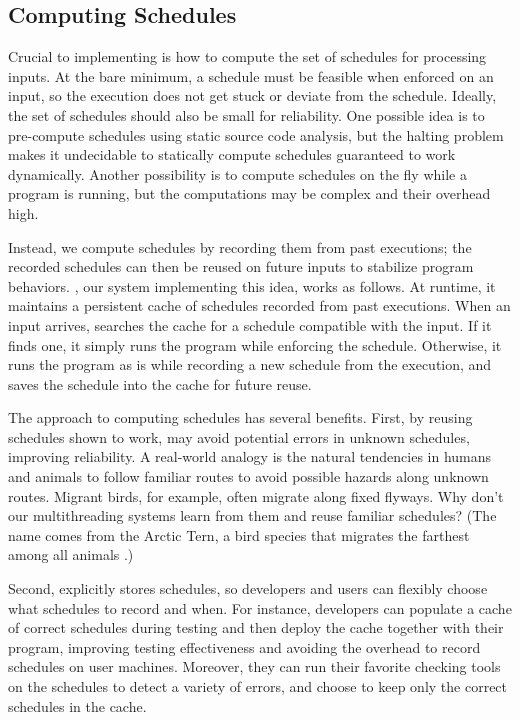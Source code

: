 \subsection{Computing Schedules} \label{sec:memoize}


Crucial to implementing \smt is how to compute the set of schedules for
processing inputs.  At the bare minimum, a schedule must be feasible when
enforced on an input, so the execution does not get stuck or deviate from
the schedule.  Ideally, the set of schedules should also be small for
reliability.  One possible idea is to pre-compute schedules using static
source code analysis, but the halting problem makes it undecidable to
statically compute schedules guaranteed to work dynamically.  Another
possibility is to compute schedules on the fly while a program is running,
but the computations may be complex and their overhead high.

Instead, we compute schedules by recording them from past executions; the
recorded schedules can then be reused on future inputs to stabilize
program behaviors.  \tern, our system implementing this idea, works as
follows.  At runtime, it maintains a persistent cache of schedules
recorded from past executions.  When an input arrives, \tern searches the
cache for a schedule compatible with the input.  If it finds one, it
simply runs the program while enforcing the schedule.  Otherwise, it runs
the program as is while recording a new schedule from the execution, and
saves the schedule into the cache for future reuse.

The \tern approach to computing schedules has several benefits. First, by
reusing schedules shown to work, \tern may avoid potential errors in
unknown schedules, improving reliability.  A real-world analogy is the
natural tendencies in humans and animals to follow familiar routes to
avoid possible hazards along unknown routes.  Migrant birds, for example,
often migrate along fixed flyways.  Why don't our multithreading systems
learn from them and reuse familiar schedules?  (The name \tern comes from
the Arctic Tern, a bird species that migrates the farthest among all
animals%
.)

Second, \tern explicitly stores schedules, so developers and users can
flexibly choose what schedules to record and when.  For instance,
developers can populate a cache of correct schedules during testing and
then deploy the cache together with their program, improving testing
effectiveness and avoiding the overhead to record schedules on user
machines.  Moreover, they can run their favorite checking tools on the
schedules to detect a variety of errors, and choose to keep only the
correct schedules in the cache.

